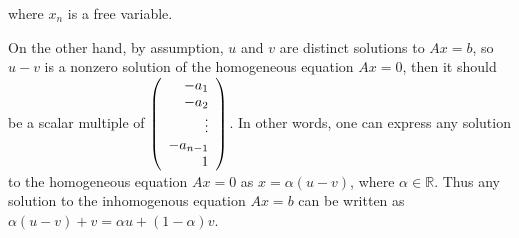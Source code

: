 \documentclass{ximera}
\begin{document}
\begin{exercise}
\begin{solution}
where $x_n$ is a free variable. 

On the other hand, by assumption, $u$ and $v$ are distinct solutions to $Ax=b$, so $u-v$ is a nonzero solution of the homogeneous equation $Ax=0$, then it should be a scalar multiple of $\left(\begin{array}{rrrrrrrrrrrrrrrrrr} -a_1 \\ -a_2 \\ \vdots \\-a_{n-1}\\ 1 \end{array}\right)$. In other words, one can express any solution to the homogeneous equation $Ax=0$ as $x=\alpha(u-v)$, where $\alpha\in \mathbb R$. Thus any solution to the inhomogenous equation $Ax=b$ can be written as $\alpha(u-v)+v=\alpha u+(1-\alpha)v$.


\end{solution}
\end{exercise}
\end{document}
